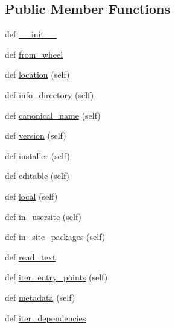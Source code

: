 \subsection*{Public Member Functions}
\begin{DoxyCompactItemize}
\item 
def \hyperlink{classpip_1_1__internal_1_1metadata_1_1pkg__resources_1_1Distribution_a6c80073de9ee28d32e33079b9d02978e}{\+\_\+\+\_\+init\+\_\+\+\_\+}
\item 
def \hyperlink{classpip_1_1__internal_1_1metadata_1_1pkg__resources_1_1Distribution_a2093c029e396a79d523728079f1296c0}{from\+\_\+wheel}
\item 
def \hyperlink{classpip_1_1__internal_1_1metadata_1_1pkg__resources_1_1Distribution_a2dd92f506a6369efa019d5a6781a9fb3}{location} (self)
\item 
def \hyperlink{classpip_1_1__internal_1_1metadata_1_1pkg__resources_1_1Distribution_ae704a8cb0e63827507df7a4b984a2ee4}{info\+\_\+directory} (self)
\item 
def \hyperlink{classpip_1_1__internal_1_1metadata_1_1pkg__resources_1_1Distribution_ae1c6c6f1cc431da73e29f5d3546ebbf8}{canonical\+\_\+name} (self)
\item 
def \hyperlink{classpip_1_1__internal_1_1metadata_1_1pkg__resources_1_1Distribution_ad7d6932f0816a9a93952a741a9d69526}{version} (self)
\item 
def \hyperlink{classpip_1_1__internal_1_1metadata_1_1pkg__resources_1_1Distribution_a3db5dfbd7e844d0d40448c9f4cc3078f}{installer} (self)
\item 
def \hyperlink{classpip_1_1__internal_1_1metadata_1_1pkg__resources_1_1Distribution_af6fb41da9bab2b76f7a2ae12e927d48a}{editable} (self)
\item 
def \hyperlink{classpip_1_1__internal_1_1metadata_1_1pkg__resources_1_1Distribution_a6ac2d31903d223641c2f615187cdfb43}{local} (self)
\item 
def \hyperlink{classpip_1_1__internal_1_1metadata_1_1pkg__resources_1_1Distribution_a496e59a1529e6b320b8fb0c255c511af}{in\+\_\+usersite} (self)
\item 
def \hyperlink{classpip_1_1__internal_1_1metadata_1_1pkg__resources_1_1Distribution_a9fb736ae286c91fae80c31e51d87d9b0}{in\+\_\+site\+\_\+packages} (self)
\item 
def \hyperlink{classpip_1_1__internal_1_1metadata_1_1pkg__resources_1_1Distribution_a9e301d5296154b44395beba215682bbe}{read\+\_\+text}
\item 
def \hyperlink{classpip_1_1__internal_1_1metadata_1_1pkg__resources_1_1Distribution_a41c1fb92a2e5eca6392bc75e6a2899a2}{iter\+\_\+entry\+\_\+points} (self)
\item 
def \hyperlink{classpip_1_1__internal_1_1metadata_1_1pkg__resources_1_1Distribution_ae9b6d206e8d57d386997d6559f446e22}{metadata} (self)
\item 
def \hyperlink{classpip_1_1__internal_1_1metadata_1_1pkg__resources_1_1Distribution_aa283415d93da3ae63b5630623c32e7e8}{iter\+\_\+dependencies}
\end{DoxyCompactItemize}


